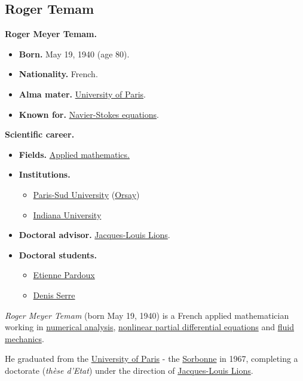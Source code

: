 \documentclass{article}
\begin{document}
\subsection{Roger Temam}
\textbf{Roger Meyer Temam.}
\begin{itemize}
	\item \textbf{Born.} May 19, 1940 (age 80).
	\item \textbf{Nationality.} French.
	\item \textbf{Alma mater.} \href{https://en.wikipedia.org/wiki/University_of_Paris}{University of Paris}.
	\item \textbf{Known for.} \href{https://en.wikipedia.org/wiki/Navier-Stokes_equations}{Navier-Stokes equations}.
\end{itemize}
\textbf{Scientific career.}
\begin{itemize}
	\item \textbf{Fields.} \href{https://en.wikipedia.org/wiki/Applied_mathematics}{Applied mathematics.}
	\item \textbf{Institutions.}
	\begin{itemize}
		\item \href{https://en.wikipedia.org/wiki/Paris-Sud_University}{Paris-Sud University} (\href{https://en.wikipedia.org/wiki/Orsay}{Orsay})
		\item \href{https://en.wikipedia.org/wiki/Indiana_University_Bloomington}{Indiana University}
	\end{itemize}
	\item \textbf{Doctoral advisor.} \href{https://en.wikipedia.org/wiki/Jacques-Louis_Lions}{Jacques-Louis Lions}.
	\item \textbf{Doctoral students.}
	\begin{itemize}
		\item \href{https://en.wikipedia.org/wiki/Etienne_Pardoux}{Etienne Pardoux}
		\item \href{https://en.wikipedia.org/wiki/Denis_Serre}{Denis Serre}
	\end{itemize}
\end{itemize}
\textit{Roger Meyer Temam} (born May 19, 1940) is a French applied mathematician working in \href{https://en.wikipedia.org/wiki/Numerical_analysis}{numerical analysis}, \href{https://en.wikipedia.org/wiki/Nonlinear_partial_differential_equations}{nonlinear partial differential equations} and \href{https://en.wikipedia.org/wiki/Fluid_mechanics}{fluid mechanics}.

He graduated from the \href{https://en.wikipedia.org/wiki/University_of_Paris}{University of Paris} - the \href{https://en.wikipedia.org/wiki/Sorbonne}{Sorbonne} in 1967, completing a doctorate (\textit{thèse d'Etat}) under the direction of \href{https://en.wikipedia.org/wiki/Jacques-Louis_Lions}{Jacques-Louis Lions}.
\end{document}
